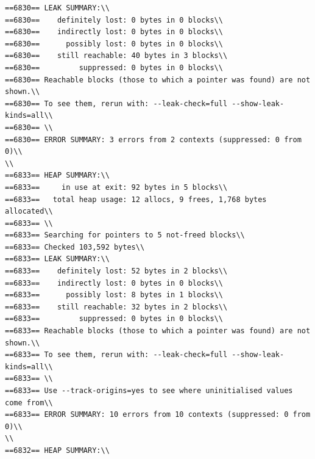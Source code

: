 \documentclass[a4paper,12pt]{report}
\begin{document}
\begin{verbatim}
==6830== LEAK SUMMARY:\\
==6830==    definitely lost: 0 bytes in 0 blocks\\
==6830==    indirectly lost: 0 bytes in 0 blocks\\
==6830==      possibly lost: 0 bytes in 0 blocks\\
==6830==    still reachable: 40 bytes in 3 blocks\\
==6830==         suppressed: 0 bytes in 0 blocks\\
==6830== Reachable blocks (those to which a pointer was found) are not shown.\\
==6830== To see them, rerun with: --leak-check=full --show-leak-kinds=all\\
==6830== \\
==6830== ERROR SUMMARY: 3 errors from 2 contexts (suppressed: 0 from 0)\\
\\
==6833== HEAP SUMMARY:\\
==6833==     in use at exit: 92 bytes in 5 blocks\\
==6833==   total heap usage: 12 allocs, 9 frees, 1,768 bytes allocated\\
==6833== \\
==6833== Searching for pointers to 5 not-freed blocks\\
==6833== Checked 103,592 bytes\\
==6833== LEAK SUMMARY:\\
==6833==    definitely lost: 52 bytes in 2 blocks\\
==6833==    indirectly lost: 0 bytes in 0 blocks\\
==6833==      possibly lost: 8 bytes in 1 blocks\\
==6833==    still reachable: 32 bytes in 2 blocks\\
==6833==         suppressed: 0 bytes in 0 blocks\\
==6833== Reachable blocks (those to which a pointer was found) are not shown.\\
==6833== To see them, rerun with: --leak-check=full --show-leak-kinds=all\\
==6833== \\
==6833== Use --track-origins=yes to see where uninitialised values come from\\
==6833== ERROR SUMMARY: 10 errors from 10 contexts (suppressed: 0 from 0)\\
\\
==6832== HEAP SUMMARY:\\

\end{verbatim}
\end{document}
